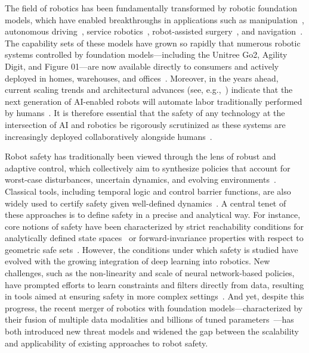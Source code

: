 The field of robotics has been fundamentally transformed by robotic foundation models, which have enabled breakthroughs in applications such as manipulation~\cite{liang2023code,arenas2024prompt, chen2022nlmapsaycan, huang2022inner}, autonomous driving~\cite{li2024driving,fan2024learning, schumann-2023-velma, sharan2023llm}, service robotics~\cite{rana2023sayplan, llm_service_robot, momallm24}, robot-assisted surgery~\cite{kim2024surgical,schmidgall2024general}, and navigation~\cite{pmlr-v205-shah23b, pmlr-v229-shah23c, xie2023reasoning}. The capability sets of these models have grown so rapidly that numerous robotic systems controlled by foundation models---including the Unitree Go2, Agility Digit, and Figure 01---are now available directly to consumers and actively deployed in homes, warehouses, and offices~\cite{zeng2023large,wang2024large}.  Moreover, in the years ahead, current scaling trends and architectural advances (see, e.g.,~\cite{sartor2024neural,pearce2024scaling}) indicate that the next generation of AI-enabled robots will automate labor traditionally performed by humans~\cite{ahn2024autort,strobel2024llm2swarm,guarascio2024will}. It is therefore essential that the safety of any technology at the intersection of AI and robotics be rigorously scrutinized as these systems are increasingly deployed collaboratively alongside humans~\cite{kim2024understanding}.


Robot safety has traditionally been viewed through the lens of robust and adaptive control, which collectively aim to synthesize policies that account for worst-case disturbances, uncertain dynamics, and evolving environments~\cite{zhou1998essentials,aastrom1995adaptive,mayne2000constrained,bemporad2007robust}. Classical tools, including temporal logic and control barrier functions, are also widely used to certify safety given well-defined dynamics~\cite{ames2014control,lindemann2018control,sadigh2016safe}.  A central tenet of these approaches is to define safety in a precise and analytical way.  For instance, core notions of safety have been characterized by strict reachability conditions for analytically defined state spaces~\cite{bertsekas2012dynamic,mitchell2005time} or forward-invariance properties with respect to geometric safe sets~\cite{prajna2004safety,ames2016control}. 
 However, the conditions under which safety is studied have evolved with the growing integration of deep learning into robotics.  New challenges, such as the non-linearity and scale of neural network-based policies, have prompted efforts to learn constraints and filters directly from data, resulting in tools aimed at ensuring safety in more complex settings~\cite{robey2020learning,achiam2017constrained,cheng2019end}.  And yet, despite this progress, the recent merger of robotics with foundation models---characterized by their fusion of multiple data modalities and billions of tuned parameters~\cite{driess2023palm,brohan2023rt}---has both introduced new threat models and widened the gap between the scalability and applicability of existing approaches to robot safety.  


